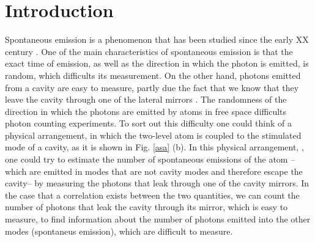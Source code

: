 \documentclass[conference]{IEEEtran}
\begin{document}
\section{Introduction}
Spontaneous emission is a phenomenon that has been studied since the
early XX century \cite{10.2307/94746, 1917PhyZ...18..121E}. One of the
main characteristics of spontaneous emission is that
 the exact time of emission, as well as
the direction in which the photon is emitted, is random, which
difficults its measurement. On the other hand, photons emitted from a
cavity are easy to measure, partly due the fact that we know that they
leave the cavity through one of the lateral mirrors \cite{326305,
  doi:10.1063/1.113345}. The randomness of the direction in which the
photons are emitted by atoms in free space difficults photon counting
experiments. To sort out this difficulty one could think of a physical
arrangement, in which the two-level atom is coupled to the stimulated
mode of a cavity, as it is shown in Fig. \ref{asa} (b). In this
physical arrangement, , one could
try to estimate the number of spontaneous emissions of the atom
--which are emitted in modes that are not cavity modes and therefore
escape the cavity-- by measuring the photons that leak through one of
the cavity mirrors. In the case that a
correlation exists between the two quantities, we can count the number
of photons that leak the cavity through its mirror, which is easy to
measure, to find information about the number of photons emitted into
the other modes (spontaneus emission), which are difficult to measure.
\end{document}
